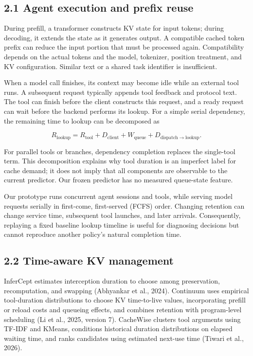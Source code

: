 \documentclass[
  english,
  10pt,
]{article}
\begin{document}
\subsection{2.1 Agent execution and prefix
reuse}\label{agent-execution-and-prefix-reuse}

During prefill, a transformer constructs KV state for input tokens;
during decoding, it extends the state as it generates output. A
compatible cached token prefix can reduce the input portion that must be
processed again. Compatibility depends on the actual tokens and the
model, tokenizer, position treatment, and KV configuration. Similar text
or a shared task identifier is insufficient.

When a model call finishes, its context may become idle while an
external tool runs. A subsequent request typically appends tool feedback
and protocol text. The tool can finish before the client constructs this
request, and a ready request can wait before the backend performs its
lookup. For a simple serial dependency, the remaining time to lookup can
be decomposed as

\[
R_{\mathrm{lookup}}=R_{\mathrm{tool}}+D_{\mathrm{client}}
 +W_{\mathrm{queue}}+D_{\mathrm{dispatch\to lookup}}.
\]

For parallel tools or branches, dependency completion replaces the
single-tool term. This decomposition explains why tool duration is an
imperfect label for cache demand; it does not imply that all components
are observable to the current predictor. Our frozen predictor has no
measured queue-state feature.

Our prototype runs concurrent agent sessions and tools, while serving
model requests serially in first-come, first-served (FCFS) order.
Changing retention can change service time, subsequent tool launches,
and later arrivals. Consequently, replaying a fixed baseline lookup
timeline is useful for diagnosing decisions but cannot reproduce another
policy's natural completion time.

\subsection{2.2 Time-aware KV
management}\label{time-aware-kv-management}

InferCept estimates interception duration to choose among preservation,
recomputation, and swapping (Abhyankar et al., 2024). Continuum uses
empirical tool-duration distributions to choose KV time-to-live values,
incorporating prefill or reload costs and queueing effects, and combines
retention with program-level scheduling (Li et al., 2025, version 7).
CacheWise clusters tool arguments using TF-IDF and KMeans, conditions
historical duration distributions on elapsed waiting time, and ranks
candidates using estimated next-use time (Tiwari et al., 2026).
\end{document}
